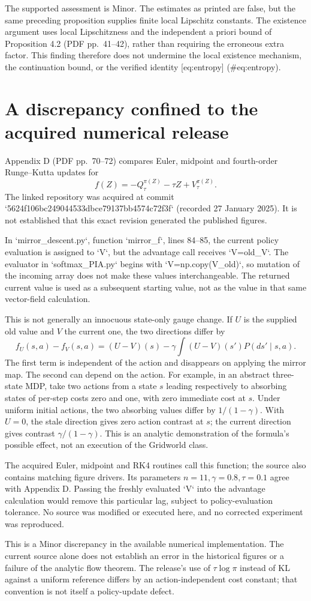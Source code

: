 \documentclass[10pt]{article}
\begin{document}
The supported assessment is Minor. The estimates as printed are false, but the same preceding proposition supplies finite local Lipschitz constants. The existence argument uses local Lipschitzness and the independent a priori bound of Proposition 4.2 (PDF pp. 41–42), rather than requiring the erroneous extra factor. This finding therefore does not undermine the local existence mechanism, the continuation bound, or the verified identity [eq:entropy] (\#eq:entropy).\par
\section*{A discrepancy confined to the acquired numerical release}
Appendix D (PDF pp. 70–72) compares Euler, midpoint and fourth-order Runge–Kutta updates for \[f(Z)=-Q_\tau^{\pi(Z)}-\tau Z+V_\tau^{\pi(Z)}.\] The linked repository was acquired at commit `5624f106bc249044533dbce79137bb4574c72f3f` (recorded 27 January 2025). It is not established that this exact revision generated the published figures.\par
In `mirror\_descent.py`, function `mirror\_f`, lines 84–85, the current policy evaluation is assigned to `V`, but the advantage call receives `V=old\_V`. The evaluator in `softmax\_PIA.py` begins with `V=np.copy(V\_old)`, so mutation of the incoming array does not make these values interchangeable. The returned current value is used as a subsequent starting value, not as the value in that same vector-field calculation.\par
This is not generally an innocuous state-only gauge change. If \(U\) is the supplied old value and \(V\) the current one, the two directions differ by \[f_U(s,a)-f_V(s,a)
 =(U-V)(s)-\gamma\int(U-V)(s')P(ds'\mid s,a).\] The first term is independent of the action and disappears on applying the mirror map. The second can depend on the action. For example, in an abstract three-state MDP, take two actions from a state \(s\) leading respectively to absorbing states of per-step costs zero and one, with zero immediate cost at \(s\). Under uniform initial actions, the two absorbing values differ by \(1/(1-\gamma)\). With \(U=0\), the stale direction gives zero action contrast at \(s\); the current direction gives contrast \(\gamma/(1-\gamma)\). This is an analytic demonstration of the formula’s possible effect, not an execution of the Gridworld class.\par
The acquired Euler, midpoint and RK4 routines call this function; the source also contains matching figure drivers. Its parameters \(n=11,\gamma=0.8,\tau=0.1\) agree with Appendix D. Passing the freshly evaluated `V` into the advantage calculation would remove this particular lag, subject to policy-evaluation tolerance. No source was modified or executed here, and no corrected experiment was reproduced.\par
This is a Minor discrepancy in the available numerical implementation. The current source alone does not establish an error in the historical figures or a failure of the analytic flow theorem. The release’s use of \(\tau\log\pi\) instead of KL against a uniform reference differs by an action-independent cost constant; that convention is not itself a policy-update defect.\par
\end{document}
